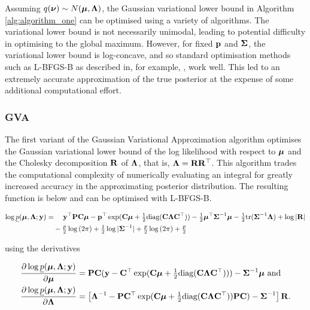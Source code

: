 \documentclass{article}[12pt]
\begin{document}

Assuming $q({\boldsymbol \nu}) \sim N({\boldsymbol \mu}, {\boldsymbol \Lambda})$, the Gaussian variational lower bound in Algorithm
\ref{alg:algorithm_one} can be optimised using a variety of algorithms. The variational lower bound is not
necessarily unimodal, leading to potential difficulty in optimising to the global maximum. However, for fixed
${\bf p}$ and ${\boldsymbol \Sigma}$, the variational lower bound is log-concave, and so standard optimisation methods such as
L-BFGS-B as described in, for example, \cite{Liu1989}, work well. This led to an extremely accurate
approximation of the true posterior at the expense of some additional computational effort.

\subsubsection{GVA}

The first variant of the Gaussian Variational Approximation algorithm optimises the Gaussian variational lower
bound of the log likelihood with respect to ${\boldsymbol \mu}$ and the Cholesky decomposition ${\bf R}$ of ${\boldsymbol \Lambda}$, that
is, ${\boldsymbol \Lambda} = {\bf R} {\bf R}^\top$. This algorithm trades the computational complexity of numerically evaluating an
integral for greatly increased accuracy in the approximating posterior distribution. The resulting function is
below and can be optimised with L-BFGS-B.

\begin{align*}
\log \underline{p}({\boldsymbol \mu}, {\boldsymbol \Lambda}; {\bf y}) &= \quad {\bf y}^\top{\bf P} {\bf C} {\boldsymbol\mu} - {\bf p}^\top \exp({\bf C} {\boldsymbol \mu} + {\tfrac{1}{2}} \text{diag}({\bf C} {\boldsymbol \Lambda} {\bf C}^\top)) - {\tfrac{1}{2}} {\boldsymbol \mu}^\top {\boldsymbol\Sigma}^{-1} {\boldsymbol \mu} - {\tfrac{1}{2}} \text{tr}{({\boldsymbol\Sigma}^{-1} {\boldsymbol\Lambda})} + \log{|{\bf R}|} \\
&\quad - \tfrac{p}{2} \log{(2 \pi)} + {\tfrac{1}{2}} \log{|{\boldsymbol\Sigma}^{-1}|} + \tfrac{p}{2} \log{(2 \pi)} + \tfrac{p}{2} \\
\end{align*}

using the derivatives

\begin{align*}
\frac{\partial \log \underline{p}({\boldsymbol \mu}, {\boldsymbol \Lambda}; {\bf y})}{\partial {\boldsymbol\mu}} &= {\bf P} {\bf C} ({\bf y} - {\bf C}^\top \exp({\bf C} {\boldsymbol \mu} + {\tfrac{1}{2}} \text{diag}{({\bf C}{\boldsymbol\Lambda}{\bf C}^\top)})) - {\boldsymbol \Sigma}^{-1} {\boldsymbol \mu} \text{ and}\\
\frac{\partial \log \underline{p}({\boldsymbol \mu}, {\boldsymbol \Lambda}; {\bf y})}{\partial {\boldsymbol\Lambda}} &= \left [{\boldsymbol \Lambda}^{-1} - {\bf P} {\bf C}^\top \exp({\bf C} {\boldsymbol \mu} + {\tfrac{1}{2}} \text{diag}({\bf C} {\boldsymbol \Lambda} {\bf C}^\top)) {\bf P} {\bf C}) - {\boldsymbol \Sigma}^{-1} \right ] {\bf R}.
\end{align*}
\end{document}
